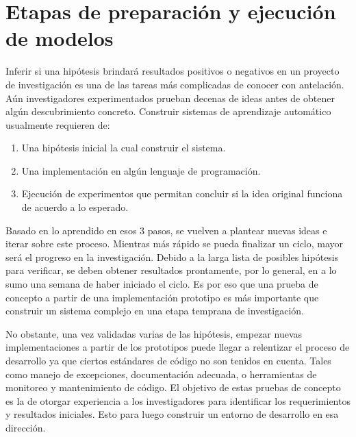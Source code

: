 \chapter{Etapas de preparación y ejecución de modelos}
\label{ch:method}

Inferir si una hipótesis brindará resultados positivos o negativos en un
proyecto de investigación es una de las tareas más complicadas de conocer con
antelación. Aún investigadores experimentados prueban decenas de ideas antes de
obtener algún descubrimiento concreto. Construir sistemas de aprendizaje
automático usualmente requieren de:

\begin{enumerate}
    \item Una hipótesis inicial la cual construir el sistema.
    \item Una implementación en algún lenguaje de programación.
    \item Ejecución de experimentos que permitan concluir si la idea original
    funciona de acuerdo a lo esperado.
\end{enumerate}

Basado en lo aprendido en esos 3 pasos, se vuelven a plantear nuevas ideas e
iterar sobre este proceso. Mientras más rápido se pueda finalizar un ciclo,
mayor será el progreso en la investigación. Debido a la larga lista de posibles
hipótesis para verificar, se deben obtener resultados prontamente, por lo
general, en a lo sumo una semana de haber iniciado el ciclo. Es por eso que una
prueba de concepto a partir de una implementación prototipo es más importante
que construir un sistema complejo en una etapa temprana de investigación.

No obstante, una vez validadas varias de las hipótesis, empezar nuevas
implementaciones a partir de los prototipos puede llegar a relentizar el proceso
de desarrollo ya que ciertos estándares de código no son tenidos en cuenta.
Tales como manejo de excepciones, documentación adecuada, o herramientas de
monitoreo y mantenimiento de código. El objetivo de estas pruebas de concepto es
la de otorgar experiencia a los investigadores para identificar los
requerimientos y resultados iniciales. Esto para luego construir un entorno de
desarrollo en esa dirección.

